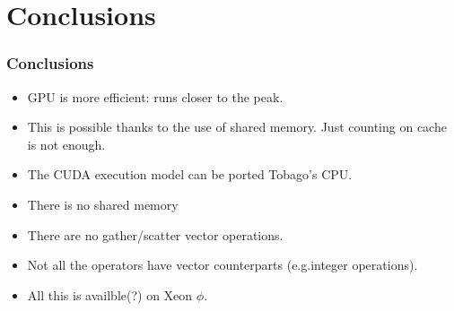 \documentclass{beamer}
\begin{document}
\section{Conclusions}

\begin{frame}
\frametitle{Conclusions}
\begin{itemize} 
\item GPU is more efficient: runs closer to the peak. 
\item This is possible thanks to the use of shared memory. Just
  counting on cache is not enough.
\item The CUDA execution model can be ported Tobago's CPU.
\item There is no shared memory 
\item There are no gather/scatter vector operations.
\item Not all the  operators have vector counterparts (e.g.integer operations).
\item All this is availble(?) on Xeon $\phi$. 
\end{itemize}
\end{frame}
\end{document}

